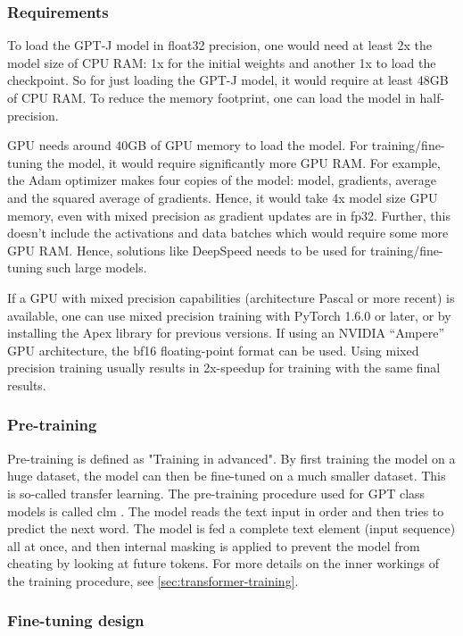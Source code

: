 \subsubsection{Requirements}
\label{sec:requirements}
To load the GPT-J model in float32 precision, one would need at least 2x the model size of CPU RAM: 1x for the initial weights and another 1x to load the checkpoint. So for just loading the GPT-J model, it would require at least 48GB of CPU RAM. To reduce the memory footprint, one can load the model in half-precision.

GPU needs around 40GB of GPU memory to load the model. For training/fine-tuning the model, it would require significantly more GPU RAM. For example, the Adam optimizer makes four copies of the model: model, gradients, average and the squared average of gradients. Hence, it would take 4x model size GPU memory, even with mixed precision as gradient updates are in fp32. Further, this doesn't include the activations and data batches which would require some more GPU RAM. Hence, solutions like DeepSpeed \cite{deepspeed} needs to be used for training/fine-tuning such large models.

If a GPU with mixed precision capabilities (architecture Pascal or more recent) is available, one can use mixed precision training with PyTorch 1.6.0 or later, or by installing the Apex library for previous versions. If using an NVIDIA “Ampere” GPU architecture, the \acrfull{bf16} floating-point format can be used. Using mixed precision training usually results in 2x-speedup for training with the same final results.

\subsubsection{Pre-training}
Pre-training is defined as "Training in advanced". By first training the model on a huge dataset, the model can then be fine-tuned on a much smaller dataset. This is so-called transfer learning. The pre-training procedure used for GPT class models is called \acrfull{clm} \cite{radford2018improving}. The model reads the text input in order and then tries to predict the next word. The model is fed a complete text element (input sequence) all at once, and then internal masking is applied to prevent the model from cheating by looking at future tokens. For more details on the inner workings of the training procedure, see \cref{sec:transformer-training}.

\subsubsection{Fine-tuning design}
\label{sec:fine-tuning-design}

